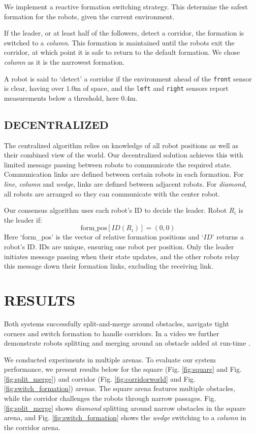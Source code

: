 \documentclass[letterpaper, 10 pt, conference]{ieeeconf}  %
\begin{document}
We implement a reactive formation switching strategy. This determine the safest formation for the robots, given the current environment.

If the leader, or at least half of the followers, detect a corridor, the formation is switched to a \textit{column}. This formation is maintained until the robots exit the corridor, at which point it is safe to return to the default formation. We chose \textit{column} as it is the narrowest formation.

A robot is said to `detect' a corridor if the environment ahead of the \texttt{front} sensor is clear, having over $1.0$m of space, and the \texttt{left} and \texttt{right} sensors report measurements below a threshold, here $0.4$m.

\subsection{DECENTRALIZED}

The centralized algorithm relies on knowledge of all robot positions as well as their combined view of the world. Our decentralized solution achieves this with limited message passing between robots to communicate the required state. Communication links are defined between certain robots in each formation. For \textit{line}, \textit{column} and \textit{wedge}, links are defined between adjacent robots. For \textit{diamond}, all robots are arranged so they can communicate with the center robot.

Our consensus algorithm uses each robot's ID to decide the leader. Robot $R_i$ is the leader if:
\[\text{form\_pos}[ID(R_i)] = (0,0)\]
Here `form\_pos' is the vector of relative formation positions and `$ID$' returns a robot's ID. IDs are unique, ensuring one robot per position. Only the leader initiates message passing when their state updates, and the other robots relay this message down their formation links, excluding the receiving link.

\section{RESULTS}

Both systems successfully split-and-merge around obstacles, navigate tight corners and switch formation to handle corridors. In a video we further demonstrate robots splitting and merging around an obstacle added at run-time \cite{repository}. 

We conducted experiments in multiple arenas. To evaluate our system performance, we present results below for the square (Fig. \ref{fig:square} and Fig. \ref{fig:split_merge}) and corridor (Fig. \ref{fig:corridorworld} and Fig. \ref{fig:switch_formation}) arenas. The square arena features multiple obstacles, while the corridor challenges the robots through narrow passages. Fig. \ref{fig:split_merge} shows \textit{diamond} splitting around narrow obstacles in the square arena, and Fig. \ref{fig:switch_formation} shows the \textit{wedge} switching to a \textit{column} in the corridor arena.
\end{document}
